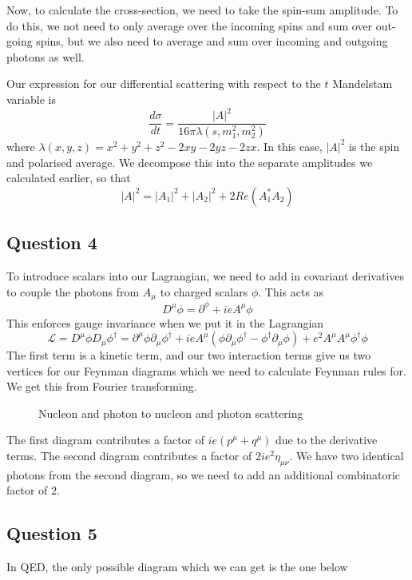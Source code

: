 Now, to calculate the cross-section, 
we need to take the spin-sum amplitude. 
To do this, we 
not need to only average over the incoming spins 
and sum over out-going spins, but 
we also need to average and sum over incoming 
and outgoing photons as well. 

Our expression for our 
differential scattering with respect to the $ t $ 
Mandelstam variable is 
\[
\frac{ d \sigma }{ dt }  = \frac{| A | ^ 2  }{ 16 \pi \lambda\left( 
s, m_1^ 2 , m_2 ^ 2 \right) }
\] where $ \lambda\left( x, y, z  \right)   = 
x ^ 2 + y ^ 2 + z ^ 2  - 2xy  - 2 yz  - 2 zx $. 
In this case, $ | A |^ 2 $ is the 
spin and polarised average. We decompose this into the 
separate amplitudes we calculated earlier, so 
that 
\[
| A | ^ 2 = | A _ 1 | ^ 2 + | A _ 2 | ^ 2 + 2 Re \left(  A_ 1 ^ * 
A _ 2 \right) 
\] 
\subsection{Question 4}
To introduce scalars into our Lagrangian, 
we need to add in covariant derivatives to couple 
the photons from $ A _ \mu $ to charged scalars $ \phi $.
This acts as 
\[
	D ^ \mu \phi  = \partial  ^ \phi + ie A ^ \mu \phi 
\] This enforces gauge invariance when we put 
it in  the Lagrangian 
\[
 \mathcal{ L }  = D ^ \mu \phi D _ \mu \phi ^\dagger = 
 \partial  ^ \mu \phi \partial  _ \mu \phi ^\dagger 
 + ie A ^ \mu \left(  \phi \partial  _ \mu \phi ^\dagger  - 
 \phi ^\dagger \partial  _ \mu \phi \right)  + e ^ 2 A ^ \mu A ^ \mu \phi ^\dagger
 \phi 
\] The first term is a kinetic term, 
and our two interaction terms give us two vertices 
for our Feynman diagrams which we need to calculate Feynman rules 
for. We get this from Fourier transforming. 

\begin{figure}[htpb]
\centering

\caption{Nucleon and photon 
to nucleon and photon scattering}%
\label{fig:e4_q1}
\end{figure}

The first diagram contributes a factor of $ i e ( p^ \mu + q^ \mu )$ 
due to the derivative terms. 
The second diagram contributes a factor 
of $ 2 i e ^ 2 \eta _{ \mu \nu  } $. 
We have two identical photons from the second 
diagram, so we need to add an additional 
combinatoric factor of $ 2 $. 



\subsection{Question 5}
In QED, the only possible diagram which 
we can get is the one below

